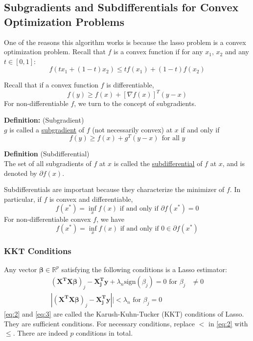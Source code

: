 \documentclass[12pt]{article}
\newcommand{\R}{\mathbb{R}}
\numberwithin{equation}{section}
\begin{document}
\subsection{Subgradients and Subdifferentials for Convex Optimization Problems}
One of the reasons this algorithm works is because the lasso problem is a convex optimization problem. Recall that $f$ is a convex function if for any $x_1$, $x_2$ and any $t \in [0, 1]$:
\begin{equation*}
  f(t x_1 + (1 - t) x_2) \le t f(x_1) + (1 - t) f(x_2)
\end{equation*}

Recall that if a convex function $f$ is differentiable,
\begin{equation*}
  f(y) \ge f(x) + [\nabla f(x)]^T (y - x)
\end{equation*}
%
For non-differentiable $f$, we turn to the concept of subgradients.

\textbf{Definition:} (Subgradient) \\
$g$ is called a \underline{subgradient} of $f$ (not necessarily convex) at $x$ if and only if
\begin{equation*}
  f(y) \ge f(x) + g^T(y - x) \ \ \text{for all } y
\end{equation*}


\textbf{Definition} (Subdifferential) \\
The set of all subgradients of $f$ at $x$ is called the \underline{subdifferential} of $f$ at $x$, and is denoted by $\partial f(x)$. 

Subdifferentials are important because they characterize the minimizer of $f$. In particular, if $f$ is convex and differentiable,
\begin{equation*}
  f(x^*) = \inf_{x} f(x) \text{ if and only if } \partial f(x^*) = 0
\end{equation*}
%
For non-differentiable convex $f$, we have
\begin{equation*}
  f(x^*) = \inf_{x} f(x) \text{ if and only if } 0 \in \partial f(x^*)
\end{equation*}

\subsubsection{KKT Conditions}
Any vector $\bm{\beta} \in \R^p$ satisfying the following conditions is a Lasso estimator:
\begin{align}
  (\bm{X^T X \beta})_j - \bm{X_j^T y} + \lambda_n \text{sign}(\beta_j) = 0 \text{ \ for } \beta_j &\ne 0 \label{eq:2} \\
  |(\bm{X^T X \beta})_j - \bm{X_j^T y}|| < \lambda_n \text{ \  for } \beta_j = 0 \label{eq:3}
\end{align}
%
\eqref{eq:2} and \eqref{eq:3} are called the Karush-Kuhn-Tucker (KKT) conditions of Lasso. They are sufficient conditions. For necessary conditions, replace $<$ in \eqref{eq:2} with $\le$. There are indeed $p$ conditions in total.
\end{document}
